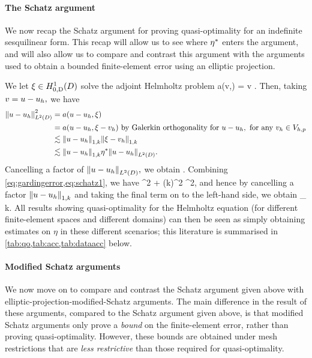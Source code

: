 \paragraph{The Schatz argument} We now recap the Schatz argument for proving quasi-optimality for an indefinite sesquilinear form. This recap will allow us to see where $\eta^{*}$ enters the argument, and will also allow us to compare and contrast this argument with the arguments used to obtain a bounded finite-element error using an elliptic projection.

We let $\xi \in \HozDD$ solve the adjoint Helmholtz problem
\beqs
a(v,\xi) =  \tforall v \in \HozDD.
\eeqs
Then, taking $v = u-u_{h},$ we have
\begin{align}
  \NLtD{u-\uh}^2 &= a(u-\uh,\xi)\label{eq:schatz0}\\
  &=a(u-\uh,\xi - \vh) \text{ by Galerkin orthogonality for } u-\uh, \text{ for any } \vh \in \Vhp\nonumber\\
  &\lesssim \NW{u-\uh}\NW{\xi-\vh}\nonumber\\
  &\lesssim \NW{u-\uh} \wbaadj \NLtD{u-\uh}\nonumber.
\end{align}
Cancelling a factor of $\NLtD{u-\uh},$ we obtain
\beq\label{eq:schatz1}
 \lesssim \wbaadj {}.
\eeq
Combining \cref{eq:gardingerror,eq:schatz1}, we have
\beqs
{}^2 \lesssim {} + \mleft(k\wbaadj\mright)^2 ^2,
\eeqs
and hence by cancelling a factor $\NW{u-\uh}$ and taking the final term on to the left-hand side, we obtain
\beqs
{} \lesssim \inf_{\vh \in \Vhp}  \tif k\wbaadj {}.
\eeqs
All results showing quasi-optimality for the Helmholtz equation (for different finite-element spaces and different domains) can then be seen as simply obtaining estimates on $\eta$ in these different scenarios; this literature is summarised in \cref{tab:qo,tab:acc,tab:dataacc} below.

\paragraph{Modified Schatz arguments} We now move on to compare and contrast the Schatz argument given above with elliptic-projection-modified-Schatz arguments. The main difference in the result of these arguments, compared to the Schatz argument given above, is that modified Schatz arguments only prove a \emph{bound} on the finite-element error, rather than proving quasi-optimality. However, these bounds are obtained under mesh restrictions that are \emph{less restrictive} than those required for quasi-optimality.

